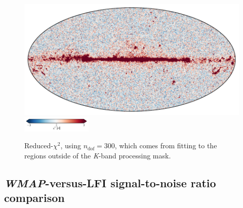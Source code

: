 \documentclass[twocolumn]{../../common/aa}
\def\WMAP{\emph{WMAP}}
\newcommand{\K}[0]{\textit K}
\begin{document}
\begin{figure}
	\centering
	\includegraphics[width=\linewidth]{figures/chisq_IQU.pdf}
	\newline
	\includegraphics[width=0.3\textwidth]{figures/cbar_3sigma.pdf}
	\caption{Reduced-$\chi^2$, using $n_\mathrm{dof}=300$, which comes from fitting to the regions outside of the \K-band processing mask.}\label{fig:reduced_chisq}
\end{figure}





\subsection{\WMAP-versus-LFI signal-to-noise ratio comparison}
\label{sec:s2n}
\end{document}
